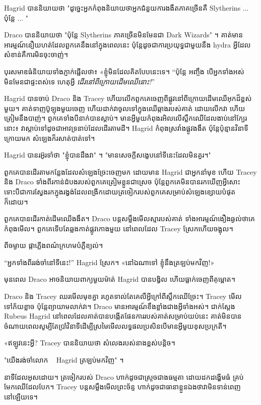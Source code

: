 Hagrid បាននិយាយថា "ដូច្នេះអ្នកកំពុងនិយាយថាអ្នកជំនួយការងងឹតភាគច្រើនគឺ Slytherins ... ប៉ុន្តែ ... "

Draco បាននិយាយថា "ប៉ុន្តែ Slytherins ភាគច្រើនមិនមែនជា Dark Wizards" ។ គាត់​មាន​អារម្មណ៍​នឿយហត់​ដែល​ពួកគេ​នឹង​នៅ​ក្នុង​ពេល​នេះ ប៉ុន្តែ​ដូច​ជា​ការ​ប្រយុទ្ធ​ជាមួយ​នឹង hydra អ្វី​ដែល​សំខាន់​គឺ​ការ​មិន​ចុះ​ចាញ់។

បុរស​មាឌ​ធំ​និយាយ​ទាំង​ភ្ញាក់ផ្អើល​ថា​៖ «​ខ្ញុំ​មិន​ដែល​គិត​បែប​នេះ​ទេ​។ “ប៉ុន្តែ អញ្ចឹង បើអ្នកទាំងអស់មិនមែនជាផ្ទះពស់ទេ ហេតុអ្វី \emph{ ដើរនៅពីក្រោយដើមឈើនោះ!}”

Hagrid បានចាប់ Draco និង Tracey ហើយលើកពួកគេចេញពីផ្លូវនៅពីក្រោយដើមឈើអុកដ៏ខ្ពស់មួយ។ គាត់​ទាញ​ប៊ូឡុង​មួយ​ចេញ ហើយ​ដាក់​វា​ចូល​ទៅ​ក្នុង​ឈើ​ឆ្កាង​របស់​គាត់ ដោយ​លើក​វា ហើយ​ត្រៀម​នឹង​បាញ់។ ពួកគេទាំងបីនាក់បានស្តាប់។ មាន​អ្វី​មួយ​កំពុង​រអិល​លើ​ស្លឹក​ឈើ​ដែល​ងាប់​នៅ​ក្បែរ​នោះ៖ វា​ស្តាប់​ទៅ​ដូច​ជា​អាវ​ទ្រនាប់​ដែល​ដើរ​តាម​ដី។ Hagrid កំពុង​ស្រវាំង​ផ្លូវ​ងងឹត ប៉ុន្តែ​ប៉ុន្មាន​វិនាទី​ក្រោយ​មក សំឡេង​ក៏​រសាត់​បាត់​ទៅ។

Hagrid បានរអ៊ូរទាំថា "ខ្ញុំបានដឹងវា" ។ "មានសេចក្តីសង្ខេបនៅទីនេះដែលមិនគួរ។"

ពួកគេបានដើរតាមកន្លែងដែលសំឡេងច្រែះចេញមក ដោយមាន Hagrid ជាអ្នកនាំមុខ ហើយ Tracey និង Draco ទាំងពីរកាន់ដំបងរបស់ពួកគេត្រៀមខ្លួនជាស្រេច ប៉ុន្តែពួកគេមិនបានរកឃើញអ្វីសោះ ទោះបីជាការស្វែងរកក្នុងរង្វង់ដែលពង្រីកដោយត្រចៀករបស់ពួកគេសម្រាប់សំឡេងខ្សោយបំផុតក៏ដោយ។

ពួកគេបានដើរកាត់ដើមឈើងងឹត។ Draco បន្តសម្លឹងមើលស្មារបស់គាត់ ទាំងអារម្មណ៍ងឿងឆ្ងល់ថាគេកំពុងមើល។ ពួកគេទើបតែឆ្លងកាត់ផ្លូវកោងមួយ នៅពេលដែល Tracey ស្រែកហើយចង្អុល។

ពីចម្ងាយ ផ្កាភ្លើងពណ៌ក្រហមបំភ្លឺខ្យល់។

“អ្នកទាំងពីររង់ចាំនៅទីនេះ!” Hagrid ស្រែក។ «នៅ​ឯណា​ទៅ ខ្ញុំ​នឹង​ត្រឡប់​មក​វិញ!»

មុនពេល Draco អាចនិយាយពាក្យមួយម៉ាត់ Hagrid បានបង្វិល ហើយធ្លាក់ចេញពីគុម្ពោត។

Draco និង Tracey ឈរមើលមុខគ្នា រហូតទាល់តែគេលឺអ្វីក្រៅពីស្លឹកឈើច្រែះ។ Tracey មើលទៅភ័យខ្លាច ប៉ុន្តែព្យាយាមលាក់វា។ Draco មាន​អារម្មណ៍​ខឹង​ខ្លាំង​ជាង​អ្វី​ទាំង​អស់។ ជាក់ស្តែង Rubeus Hagrid នៅពេលដែលគាត់បានបង្កើតផែនការរបស់គាត់សម្រាប់យប់នេះ គាត់មិនបានចំណាយពេលសូម្បីតែប្រាំវិនាទីដើម្បីស្រមៃមើលលទ្ធផលប្រសិនបើមានអ្វីមួយខុសប្រក្រតី។

«ឥឡូវ​នេះ​អ្វី? Tracey បាននិយាយថា សំលេងរបស់នាងខ្ពស់បន្តិច។

"យើងរង់ចាំលោក ~ Hagrid ត្រឡប់មកវិញ" ។

នាទីដែលអូសដោយ។ ត្រចៀករបស់ Draco ហាក់ដូចជាស្រួចជាងធម្មតា ដោយដកដង្ហើមធំ គ្រប់មែកឈើដែលបែក។ Tracey បន្តសម្លឹងមើលព្រះច័ន្ទ ហាក់ដូចជាធានាខ្លួនឯងថាវាមិនទាន់ពេញនៅឡើយទេ។

